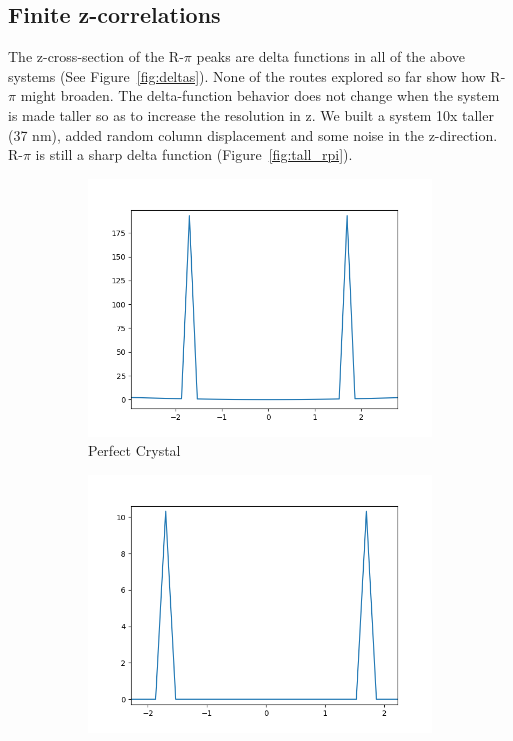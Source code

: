 \documentclass{article}
\begin{document}
  \subsection{Finite z-correlations}

  The z-cross-section of the R-$\pi$ peaks are delta functions in all of the
  above systems (See Figure~\ref{fig:deltas}). None of the routes explored so far
  show how R-$\pi$ might broaden. The delta-function behavior does not change
  when the system is made taller so as to increase the resolution in z. We built
  a system 10x taller (37 nm), added random column displacement and some noise in
  the z-direction. R-$\pi$ is still a sharp delta function
  (Figure~\ref{fig:tall_rpi}). 

  \begin{figure}
  \centering
  \begin{subfigure}{0.45\textwidth}
  \includegraphics[width=\textwidth]{perfect_rpi.png}
  \caption{Perfect Crystal}\label{fig:perfect_rpi}
  \end{subfigure}
  \begin{subfigure}{0.45\textwidth}
  \includegraphics[width=\textwidth]{displace_columns_rpi.png}

\end{subfigure}
\end{figure}
\end{document}
